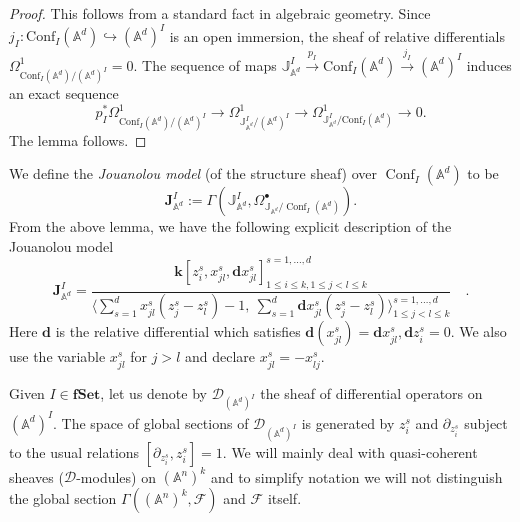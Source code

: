 \documentclass[11pt]{amsart}
\theoremstyle{definition}
\theoremstyle{remark}
\numberwithin{equation}{section}
\newcommand{\bu}{\bullet}
\renewcommand{\AA}{\mathbb{A}}
\newcommand{\op}{\operatorname}
\begin{document}
\begin{proof}
This follows from a standard fact in algebraic geometry. Since $j_{{I}}\colon \mathrm{Conf}_{{I}}(\mathbb{A}^d)
\hookrightarrow (\mathbb{A}^d)^{{I}}$ is an open immersion, the sheaf of relative differentials $\Omega^1_{\mathrm{Conf}_{{I}}(\mathbb{A}^d)/(\mathbb{A}^d)^{{I}}}=0$. The sequence of maps $\mathbb{J}_{\mathbb{A}^d}^{{I}}\xrightarrow{p_{{I}}}\mathrm{Conf}_{{I}}(\mathbb{A}^d)\xrightarrow{j_{{I}}}(\mathbb{A}^d)^{{I}}$ induces an exact sequence
\[
p^*_{{I}}\Omega^1_{\mathrm{Conf}_{{I}}(\mathbb{A}^d)/(\mathbb{A}^d)^{{I}}}\rightarrow\Omega^{1}_{\mathbb{J}_{\mathbb{A}^d}^{{I}}/(\mathbb{A}^d)^{{I}}}\rightarrow  \Omega^{1}_{\mathbb{J}_{\mathbb{A}^d}^{{I}}/\mathrm{Conf}_{{I}}(\mathbb{A}^d)}\rightarrow 0.
\]
The lemma follows.
\end{proof}

We define the \textit{Jouanolou model} (of the structure sheaf) over $\op{Conf}_I(\AA^d)$ to be
\begin{equation}\label{}
  \mathbf{J}_{\AA^d}^I := \Gamma(\mathbb{J}_{\AA^d}^I, \Omega^\bu_{\mathbb{J}_{\AA^d}/\op{Conf}_I(\AA^d)}) .
\end{equation}
From the above lemma, we have the following explicit description of the Jouanolou model
\[
\mathbf{J}_{\mathbb{A}^d}^{{I}}=\frac{\mathbf{k}[z^s_i,x^s_{jl},\mathbf{d}x^s_{jl}]^{s=1,\dots,d}_{1\leq i\leq k, 1\leq j<l\leq k}}{\langle \sum\limits_{s=1}^dx^s_{jl}(z^s_j-z^s_l)-1,\ \sum\limits_{s=1}^d\mathbf{d}x^s_{jl}(z^s_j-z^s_l) \rangle^{s=1,\dots,d}_{1\leq j<l\leq k}}\quad .
\]
Here $\mathbf{d}$ is the relative differential which satisfies $\mathbf{d}(x^s_{jl})=\mathbf{d}x^s_{jl}, \mathbf{d}z^s_i=0$. We also use the variable $x^s_{jl}$ for $j>l$ and declare $x^s_{jl}=-x^s_{lj}$.


Given ${I}\in {\mathbf{fSet}}$, let us denote by $\mathcal{D}_{(\mathbb{A}^d)^{{I}}}$ the sheaf of differential
operators on $(\mathbb{A}^d)^{{I}}$. The space of global sections of $\mathcal{D}_{(\mathbb{A}^d)^{{I}}}$ is generated
by $z^s_{i}$ and $ \partial_{z^s_{i}}$ subject to the usual relations $[\partial_{z^s_{i}},z^s_{i}]=1$.
We will mainly deal with quasi-coherent sheaves ($\mathcal{D}$-modules) on $(\mathbb{A}^n)^k$ and to simplify notation we will not distinguish the global section $\Gamma\left((\mathbb{A}^n)^k,\mathcal{F}\right)$ and $\mathcal{F}$ itself.
\end{document}
